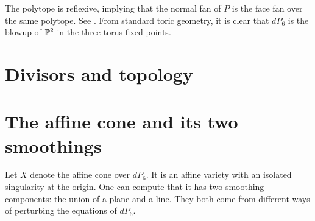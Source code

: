 \documentclass[]{uiophd}
\begin{document}
The polytope is reflexive, implying that the normal fan of $P$ is the face fan over the same polytope. See . From standard toric geometry, it is clear that $dP_6$ is the blowup of $\mathbb{P}^2$ in the three torus-fixed points. 

\section{Divisors and topology}


\section{The affine cone and its two smoothings}

Let $X$ denote the affine cone over $dP_6$. It is an affine variety with an isolated singularity at the origin. One can compute that it has two smoothing components: the union of a plane and a line. They both come from different ways of perturbing the equations of $dP_6$.
\end{document}

